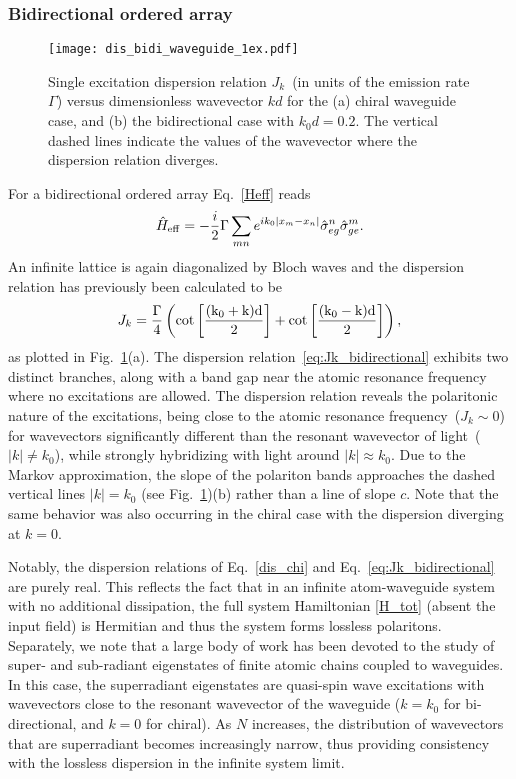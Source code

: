 \documentclass[pra,twocolumn,showpacs,preprintnumbers,amsmath,amssymb]{revtex4-1}
\begin{document}
\subsubsection{Bidirectional ordered array}

\begin{figure}
\centering
\texttt{[image: dis\_bidi\_waveguide\_1ex.pdf]}%
\caption{Single excitation dispersion relation $J_k$~(in units of the emission rate $\Gamma$) versus dimensionless wavevector $kd$ for the (a) chiral waveguide case, and  (b) the bidirectional case with $k_0d=0.2$. The vertical dashed lines indicate the values of the wavevector where the dispersion relation diverges.}
\label{fig:setup_dis1ex}
\end{figure}

For a bidirectional ordered array  Eq.~\eqref{Heff} reads
\begin{equation}\label{Heffbidi}
\hat H_{\rm eff}=-\frac{i}{2}\Gamma\sum_{mn}e^{ik_0|x_m-x_n|}\hat\sigma^n_{eg}\hat\sigma^m_{ge}.
\end{equation}
An infinite lattice is again diagonalized by Bloch waves and the  dispersion relation
 has previously been calculated to be~\cite{Albrecht}
\begin{equation}
J_k=\frac{\Gamma}{4}\left(\rm cot\left[\frac{(k_0+k)d}{2}\right]+\rm cot\left[\frac{(k_0-k)d}{2}\right]\right),\label{eq:Jk_bidirectional}
\end{equation}
as plotted in Fig.~\ref{fig:setup_dis1ex}(a). 
The dispersion relation~\eqref{eq:Jk_bidirectional} exhibits two distinct branches, along with a band gap near the atomic resonance frequency where no excitations are allowed. The dispersion relation reveals the polaritonic nature of the excitations, being close to the atomic resonance frequency~($J_k\sim 0$) for wavevectors significantly different than the resonant wavevector of light~($|k|\neq k_0$), while strongly hybridizing with light around $|k|\approx k_0$. Due to the Markov approximation, the slope of the polariton bands approaches the dashed vertical lines $|k|=k_0$ (see Fig.~\ref{fig:setup_dis1ex})(b) rather than a line of slope $c$. Note that the same behavior was also occurring in the chiral case with the dispersion diverging at $k=0$.

Notably, the dispersion relations of Eq.~\eqref{dis_chi} and Eq.~\eqref{eq:Jk_bidirectional} are purely real. This reflects the fact that in an infinite atom-waveguide system with no additional dissipation, the full system Hamiltonian \eqref{H_tot} (absent the input field) is Hermitian and thus the system forms lossless polaritons. Separately, we note that a large body of work has been devoted to the study of super- and sub-radiant eigenstates of finite atomic chains coupled to waveguides\cite{Albrecht,Loic,buchler}. In this case, the superradiant eigenstates are quasi-spin wave excitations with wavevectors close to the resonant wavevector of the waveguide ($k=k_0$ for bi-directional, and $k=0$ for chiral). As $N$ increases, the distribution of wavevectors that are superradiant becomes increasingly narrow, thus providing consistency with the lossless dispersion in the infinite system limit.
\end{document}
